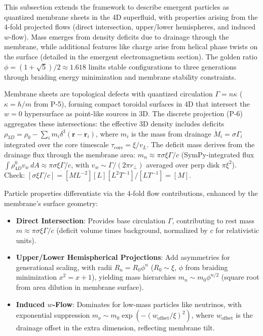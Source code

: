 This subsection extends the framework to describe emergent particles as quantized membrane sheets in the 4D superfluid, with properties arising from the 4-fold projected flows (direct intersection, upper/lower hemispheres, and induced $w$-flow). Mass emerges from density deficits due to drainage through the membrane, while additional features like charge arise from helical phase twists on the surface (detailed in the emergent electromagnetism section). The golden ratio $\phi = (1 + \sqrt{5})/2 \approx 1.618$ limits stable configurations to three generations through braiding energy minimization and membrane stability constraints.

Membrane sheets are topological defects with quantized circulation $\Gamma = n \kappa$ ($\kappa = h / m$ from P-5), forming compact toroidal surfaces in 4D that intersect the $w=0$ hypersurface as point-like sources in 3D. The discrete projection (P-6) aggregates these intersections: the effective 3D density includes deficits $\rho_{3D} = \rho_0 - \sum_i m_i \delta^3(\mathbf{r} - \mathbf{r}_i)$, where $m_i$ is the mass from drainage $\dot{M}_i = \sigma \Gamma_i$ integrated over the core timescale $\tau_{\text{core}} = \xi / v_L$. The deficit mass derives from the drainage flux through the membrane area: $m_n \approx \pi \sigma \xi \Gamma / c$ (SymPy-integrated flux $\int \rho_{4D}^0 v_w \, dA \approx \pi \sigma \xi \Gamma / c$, with $v_w \sim \Gamma / (2\pi r_\perp)$ averaged over perp disk $\pi \xi^2$). Check: $[\sigma \xi \Gamma / c] = [M L^{-2}] [L] [L^2 T^{-1}] / [L T^{-1}] = [M]$.

Particle properties differentiate via the 4-fold flow contributions, enhanced by the membrane's surface geometry:
\begin{itemize}
\item \textbf{Direct Intersection}: Provides base circulation $\Gamma$, contributing to rest mass $m \approx \pi \sigma \xi \Gamma / c$ (deficit volume times background, normalized by $c$ for relativistic units).
\item \textbf{Upper/Lower Hemispherical Projections}: Add asymmetries for generational scaling, with radii $R_n = R_0 \phi^n$ ($R_0 \sim \xi$, $\phi$ from braiding minimization $x^2 = x + 1$), yielding mass hierarchies $m_n \sim m_0 \phi^{n/2}$ (square root from area dilution in membrane surface).
\item \textbf{Induced $w$-Flow}: Dominates for low-mass particles like neutrinos, with exponential suppression $m_\nu \sim m_0 \exp(- (w_{\text{offset}} / \xi)^2)$, where $w_{\text{offset}}$ is the drainage offset in the extra dimension, reflecting membrane tilt.
\end{itemize}


